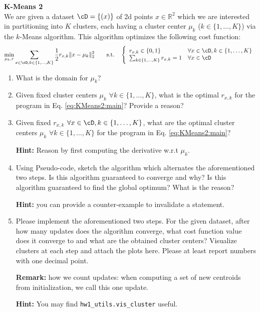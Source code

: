 \begin{Q}
\textbf{\Large K-Means 2}\\

We are given a dataset $\cD = \{(x)\}$ of 2d points $x\in\mathbb{R}^2$ which we are interested in partitioning into $K$ clusters, each having a cluster center $\mu_k$ ($k\in\{1, \ldots, K\}$) via the $k$-Means algorithm. This algorithm optimizes the following cost function:
\begin{equation}
	\min_{\mu_k, r} \sum_{x\in\cD,k\in\{1, \ldots, K\}} \frac{1}{2}r_{x,k}\|x - \mu_k\|_2^2 \quad\quad\text{s.t.}\quad \left\{\begin{array}{ll}
r_{x,k}\in\{0,1\}&\forall x\in\cD,k\in\{1, \ldots, K\}\\
\sum_{k\in\{1, \ldots, K\}} r_{x,k} = 1 & \forall x\in\cD
\end{array}\right.
\label{eq:KMeans2:main}
\end{equation}

\begin{enumerate}

\item What is the domain for $\mu_k$?

\item Given fixed cluster centers $\mu_k$ $\forall k\in\{1, \ldots, K\}$, what is the optimal $r_{x,k}$ for the program in Eq. \ref{eq:KMeans2:main}? Provide a reason?

\item Given fixed $r_{x,k}$ $\forall x\in\cD,k\in\{1, \ldots, K\}$, what are the optimal cluster centers $\mu_k$ $\forall k\in\{1, \ldots, K\}$ for the program in Eq. \ref{eq:KMeans2:main}? 

\textbf{Hint:} Reason by first computing the derivative w.r.t $\mu_k$.

\item Using Pseudo-code, sketch the algorithm which alternates the aforementioned two steps. Is this algorithm guaranteed to converge and why? Is this algorithm guaranteed to find the global optimum? What is the reason?

\textbf{Hint:} you can provide a counter-example to invalidate a statement.

\item Please implement the aforementioned two steps. For the given dataset, after how many updates does the algorithm converge, what cost function value does it converge to and what are the obtained cluster centers? Visualize clusters at each step and attach the plots here. Please at least report numbers with one decimal point.

\textbf{Remark:} how we count updates: when computing a set of new centroids from initialization, we call this one update.

\textbf{Hint:} You may find \texttt{hw1\_utils.vis\_cluster} useful.


\end{enumerate}


\end{Q}
          